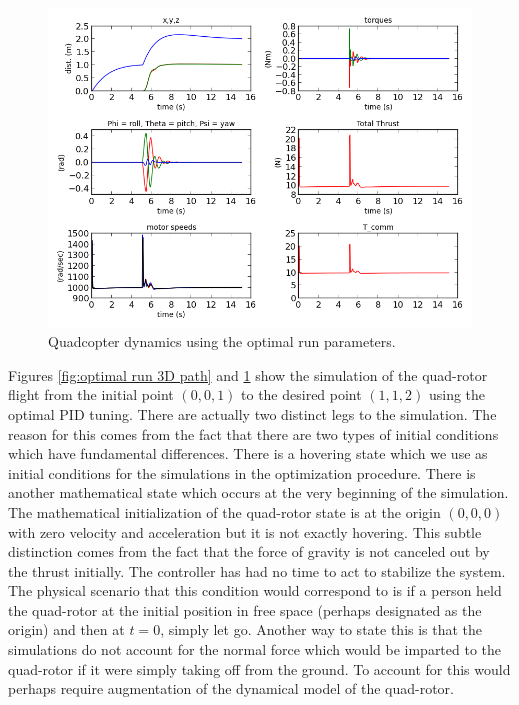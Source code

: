 \begin{figure}[htbp]
	\centering
		\includegraphics[width=\textwidth]{Figures/optimal_run_time_domain.png}
	\caption[Quadcopter dynamics using the optimal run parameters.]{Quadcopter dynamics using the optimal run parameters.}
	\label{fig:optimal run time domain}
\end{figure}

Figures \ref{fig:optimal run 3D path} and \ref{fig:optimal run time domain} show the simulation of the quad-rotor flight from the initial point $(0,0,1)$ to the desired point $(1,1,2)$ using the optimal PID tuning. There are actually two distinct legs to the simulation. The reason for this comes from the fact that there are two types of initial conditions which have fundamental differences. There is a hovering state which we use as initial conditions for the simulations in the optimization procedure. There is another mathematical state which occurs at the very beginning of the simulation. The mathematical initialization of the quad-rotor state is at the origin $(0,0,0)$ with zero velocity and acceleration but it is not exactly hovering. This subtle distinction comes from the fact that the force of gravity is not canceled out by the thrust initially. The controller has had no time to act to stabilize the system. The physical scenario that this condition would correspond to is if a person held the quad-rotor at the initial position in free space (perhaps designated as the origin) and then at $t=0$, simply let go. Another way to state this is that the simulations do not account for the normal force which would be imparted to the quad-rotor if it were simply taking off from the ground. To account for this would perhaps require augmentation of the dynamical model of the quad-rotor.

